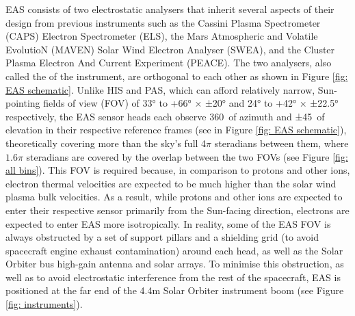 EAS consists of two electrostatic analysers that inherit several aspects of their design from previous instruments such as the Cassini Plasma Spectrometer (CAPS) Electron Spectrometer (ELS)\cite{young2004}, the Mars Atmospheric and Volatile EvolutioN (MAVEN) Solar Wind Electron Analyser (SWEA)\cite{mitchell2016}, and the Cluster Plasma Electron And Current Experiment (PEACE)\cite{johnstone1997}. The two analysers, also called the  of the instrument\cite{owen2021}, are orthogonal to each other as shown in Figure \ref{fig: EAS schematic}. Unlike HIS and PAS, which can afford relatively narrow, Sun-pointing fields of view (FOV) of 33° to +66° × ±20° and 24° to +42° × ±22.5° respectively, the EAS sensor heads each observe 360\degree\ of azimuth and ±45\degree\ of elevation in their respective reference frames (see  in Figure \ref{fig: EAS schematic}), theoretically covering more than the sky's full 4\(\pi\) steradians between them, where \(1.6\pi\) steradians are covered by the overlap between the two FOVs (see Figure \ref{fig: all bins})\cite{owen2020}. This FOV is required because, in comparison to protons and other ions, electron thermal velocities are expected to be much higher than the solar wind plasma bulk velocities. As a result, while protons and other ions are expected to enter their respective sensor primarily from the Sun-facing direction, electrons are expected to enter EAS more isotropically\cite{owen2020}. In reality, some of the EAS FOV is always obstructed by a set of support pillars and a shielding grid (to avoid spacecraft engine exhaust contamination) around each head, as well as the Solar Orbiter bus high-gain antenna and solar arrays\cite{owen2020}\cite{owen2021}\cite{dickson2024}. To minimise this obstruction, as well as to avoid electrostatic interference from the rest of the spacecraft,  EAS is positioned at the far end of the 4.4m Solar Orbiter instrument boom (see Figure \ref{fig: instruments})\cite{owen2020}\cite{olaskoaga2017}.
\\

